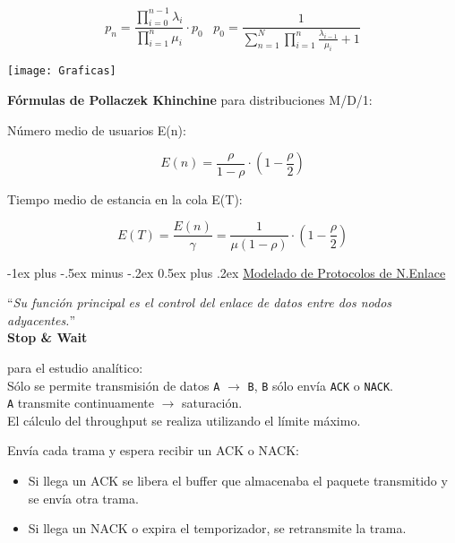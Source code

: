 \documentclass[9pt,landscape]{article}
\makeatletter
\renewcommand{\section}{\@startsection{section}{1}{0mm}%
                                {-1ex plus -.5ex minus -.2ex}%
                                {0.5ex plus .2ex}%
                                {\normalfont\large\bfseries}}
\makeatother
\begin{document}
\begin{multicols}{3}
	\begin{equation*}
	p_{n} = \frac{\prod_{i = 0}^{n-1} \lambda_{i}}{\prod_{i = 1}^{n} \mu_{i}} \cdot p_{0} \hspace{10pt}  p_{0} = \frac{1}{\sum_{n = 1}^{N} \prod_{i = 1}^{n} \frac{\lambda_{i-1}}{\mu_{i}} +1}
	\end{equation*}
	
	\begin{center}
		\texttt{[image: Graficas]}
	\end{center}

\textbf{Fórmulas de Pollaczek Khinchine} para distribuciones M/D/1:

Número medio de usuarios E(n):

	\begin{equation*}
	E(n) = \frac{\rho}{1 - \rho} \cdot \left( 1 - \frac{\rho}{2} \right)%
	\end{equation*}

Tiempo medio de estancia en la cola E(T):

	\begin{equation*}
	E(T) = \frac{E(n)}{\gamma} = \frac{1}{\mu (1 - \rho)} \cdot \left( 1 - \frac{\rho}{2} \right) %
	\end{equation*}


\section{\underline{Modelado de Protocolos de N.Enlace}}

``\textit{Su función principal es el control del enlace de datos entre dos nodos adyacentes.}''\\

\qquad \textbf{Stop \& Wait}

 para el estudio analítico:\\
	\quad Sólo se permite transmisión de datos \texttt{A} $\rightarrow$ \texttt{B}, \texttt{B} sólo envía \texttt{ACK} o \texttt{NACK}.\\
	\quad \texttt{A} transmite continuamente $\rightarrow$ saturación.\\
	\quad El cálculo del throughput se realiza utilizando el límite máximo.
	


Envía cada trama y espera recibir un ACK o NACK:

	\begin{itemize}
		\item Si llega un ACK se libera el buffer que almacenaba el paquete transmitido y se envía otra trama.
		\item Si llega un NACK o expira el temporizador, se retransmite la trama.
	\end{itemize}


\end{multicols}
\end{document}
